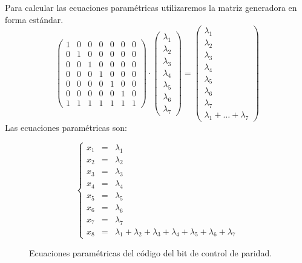 Para calcular las ecuaciones param\'etricas utilizaremos la matriz generadora
en forma est\'andar.
\begin{displaymath}
\left( \begin{array}{ccccccc}
1&0&0&0&0&0&0\\
0&1&0&0&0&0&0\\
0&0&1&0&0&0&0\\
0&0&0&1&0&0&0\\
0&0&0&0&1&0&0\\
0&0&0&0&0&1&0\\
1&1&1&1&1&1&1
\end{array} \right) \cdot
\left( \begin{array}{c}
\lambda_1\\
\lambda_2\\
\lambda_3\\
\lambda_4\\
\lambda_5\\
\lambda_6\\
\lambda_7
\end{array} \right) =
\left( \begin{array}{c}
\lambda_1\\
\lambda_2\\
\lambda_3\\
\lambda_4\\
\lambda_5\\
\lambda_6\\
\lambda_7\\
\lambda_1+\dots+\lambda_7
\end{array} \right)
\end{displaymath}
Las ecuaciones param\'etricas son:
\begin{figure}[!h]
\begin{displaymath}
\left\{ \begin{array}{ccl}
x_1&=&\lambda_1\\
x_2&=&\lambda_2\\
x_3&=&\lambda_3\\
x_4&=&\lambda_4\\
x_5&=&\lambda_5\\
x_6&=&\lambda_6\\
x_7&=&\lambda_7\\
x_8&=&\lambda_1+\lambda_2+\lambda_3+\lambda_4+\lambda_5+\lambda_6+\lambda_7
\end{array} \right.
\end{displaymath}
\caption{Ecuaciones param\'etricas del c\'odigo del bit de control de 
paridad.}
\end{figure}

